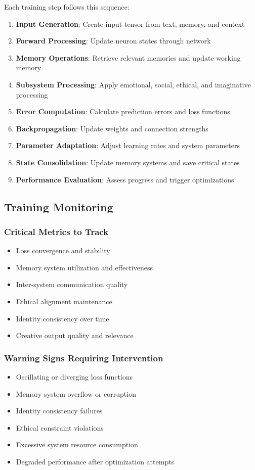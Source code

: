 \documentclass[11pt,a4paper]{article}
\begin{document}
Each training step follows this sequence:
\begin{enumerate}
    \item \textbf{Input Generation}: Create input tensor from text, memory, 
    and context
    \item \textbf{Forward Processing}: Update neuron states through network
    \item \textbf{Memory Operations}: Retrieve relevant memories and update 
    working memory
    \item \textbf{Subsystem Processing}: Apply emotional, social, ethical, 
    and imaginative processing
    \item \textbf{Error Computation}: Calculate prediction errors and loss 
    functions
    \item \textbf{Backpropagation}: Update weights and connection strengths
    \item \textbf{Parameter Adaptation}: Adjust learning rates and system 
    parameters
    \item \textbf{State Consolidation}: Update memory systems and save 
    critical states
    \item \textbf{Performance Evaluation}: Assess progress and trigger 
    optimizations
\end{enumerate}

\subsection{Training Monitoring}

\subsubsection{Critical Metrics to Track}
\begin{itemize}[leftmargin=0.5in]
    \item Loss convergence and stability
    \item Memory system utilization and effectiveness
    \item Inter-system communication quality
    \item Ethical alignment maintenance
    \item Identity consistency over time
    \item Creative output quality and relevance
\end{itemize}

\subsubsection{Warning Signs Requiring Intervention}
\begin{itemize}[leftmargin=0.5in]
    \item Oscillating or diverging loss functions
    \item Memory system overflow or corruption
    \item Identity consistency failures
    \item Ethical constraint violations
    \item Excessive system resource consumption
    \item Degraded performance after optimization attempts
\end{itemize}
\end{document}
